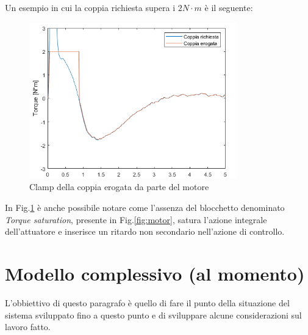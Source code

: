 Un esempio in cui la coppia richiesta supera i $2N\cdot{m}$ è il seguente:
\begin{figure}[H]
	\centering   	
	\includegraphics[width=0.8\textwidth]{Immagini/saturazione.png}
	\caption{Clamp della coppia erogata da parte del motore}
	\label{fig:clamp_motore}
\end{figure}
In Fig.\ref{fig:clamp_motore} è anche possibile notare come l'assenza del blocchetto denominato \textit{Torque saturation}, presente in Fig.\ref{fig:motor}, satura l'azione integrale dell'attuatore e inserisce un ritardo non secondario nell'azione di controllo.
\section{Modello complessivo (al momento)}
L'obbiettivo di questo paragrafo è quello di fare il punto della situazione del sistema sviluppato fino a questo punto e di sviluppare alcune considerazioni sul lavoro fatto.

